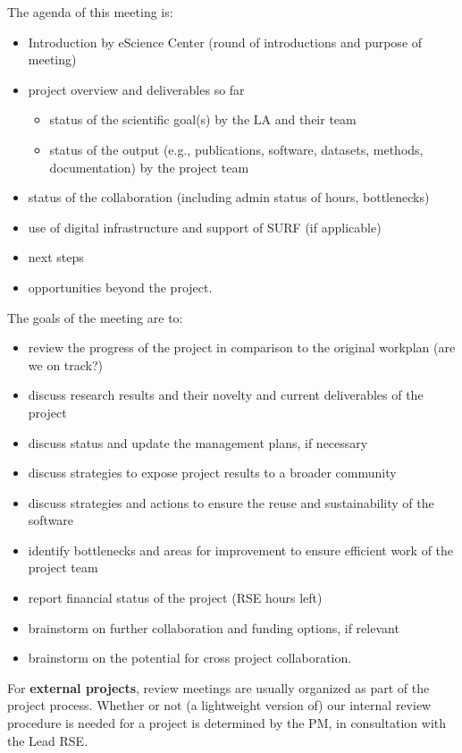 The agenda of this meeting is:
\begin{itemize}
\item Introduction by eScience Center (round of introductions and purpose of meeting)
\item project overview and deliverables so far
\begin{itemize}
\item status of the scientific goal(s) by the LA and their team
\item status of the output (e.g., publications, software, datasets, methods, documentation) by the project team
\end{itemize}
\item status of the collaboration (including admin status of hours, bottlenecks)
\item use of digital infrastructure and support of SURF (if applicable)
\item next steps
\item opportunities beyond the project.
\end{itemize}

The goals of the meeting are to:
\begin{itemize}
\item review the progress of the project in comparison to the original workplan (are we on track?)
\item discuss research results and their novelty and current deliverables of the project
\item discuss status and update the management plans, if necessary
\item discuss strategies to expose project results to a broader community
\item discuss strategies and actions to ensure the reuse and sustainability of the software
\item identify bottlenecks and areas for improvement to ensure efficient work of the project team
\item report financial status of the project (RSE hours left)
\item brainstorm on further collaboration and funding options, if relevant
\item brainstorm on the potential for cross project collaboration.
\end{itemize}

For \textbf{external projects}, review meetings are usually organized as part of the project process. Whether or not (a
lightweight version of) our internal review procedure is needed for a project is determined by the PM, in consultation
with the Lead RSE.


